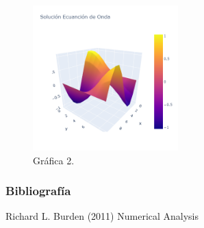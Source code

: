 \documentclass{beamer}
\begin{document}
\begin{frame}
\begin{figure}[h]
\centering
\includegraphics[width=0.5\textwidth]{OndaE2.png}
\caption{\label{fig:Pendulo2}Gráfica 2.}
\end{figure}

\end{frame}


\begin{frame}
\frametitle{Bibliografía}
\footnotesize{
\begin{thebibliography}{99} %
 Richard L. Burden (2011)
\newblock Numerical Analysis
\end{thebibliography}
}
\end{frame}
\end{document}
